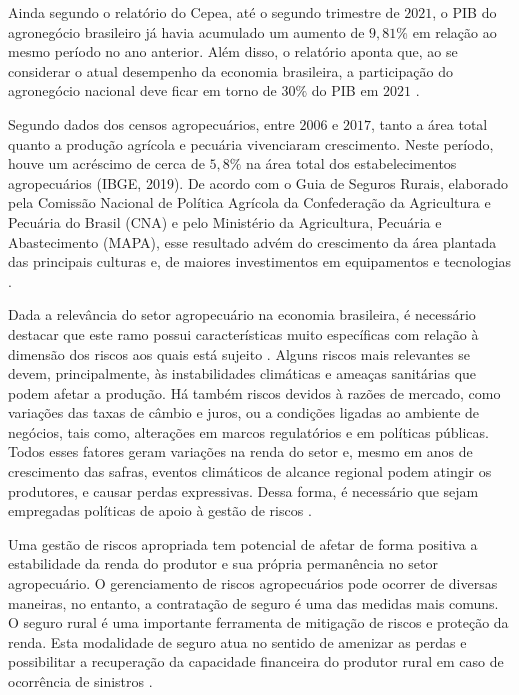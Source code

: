 \documentclass[12pt,a4paper]{article}
\begin{document}
Ainda segundo o relatório do Cepea, até o segundo trimestre de $2021$, o PIB do agronegócio brasileiro já havia acumulado um aumento de $9,81\%$ em relação ao mesmo período no ano anterior. Além disso, o relatório aponta que, ao se considerar o atual desempenho da economia brasileira, a participação do agronegócio nacional deve ficar em torno de $30\%$ do PIB em $2021$ \cite{cepea21}. 

Segundo dados dos censos agropecuários, entre $2006$ e $2017$, tanto a área total quanto a produção agrícola e pecuária vivenciaram crescimento. Neste período, houve um acréscimo de cerca de $5,8\%$ na área total dos estabelecimentos agropecuários (IBGE, 2019). De acordo com o Guia de Seguros Rurais, elaborado pela Comissão Nacional de Política Agrícola da Confederação da Agricultura e Pecuária do Brasil (CNA) e pelo Ministério da Agricultura, Pecuária e Abastecimento (MAPA), esse resultado advém do crescimento da área plantada das principais culturas e, de maiores investimentos em equipamentos e tecnologias \cite{guia_20}.

Dada a relevância do setor agropecuário na economia brasileira, é necessário destacar que este ramo possui características muito específicas com relação à dimensão dos riscos aos quais está sujeito \cite{burgo05}. Alguns riscos mais relevantes se devem, principalmente, às instabilidades climáticas e ameaças sanitárias que podem afetar a produção. Há também riscos devidos à razões de mercado, como variações das taxas de câmbio e juros, ou a condições ligadas ao ambiente de negócios, tais como, alterações em marcos regulatórios e em políticas públicas. Todos esses fatores geram variações na renda do setor e, mesmo em anos de crescimento das safras, eventos climáticos de alcance regional podem atingir os produtores, e causar perdas expressivas. Dessa forma, é necessário que sejam empregadas políticas de apoio à gestão de riscos \cite{brasil21}. 

Uma gestão de riscos apropriada tem potencial de afetar de forma positiva a estabilidade da renda do produtor e sua própria permanência no setor agropecuário. O gerenciamento de riscos agropecuários pode ocorrer de diversas maneiras, no entanto, a contratação de seguro é uma das medidas mais comuns. O seguro rural é uma importante ferramenta de mitigação de riscos e proteção da renda. Esta modalidade de seguro atua no sentido de amenizar as perdas e possibilitar a recuperação da capacidade financeira do produtor rural em caso de ocorrência de sinistros \cite{brasil19b}.  
\end{document}
